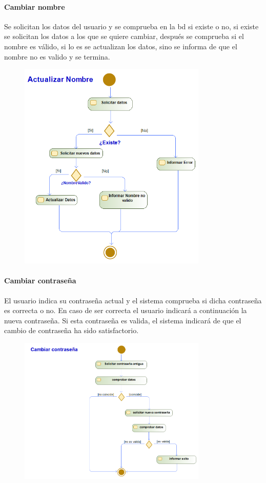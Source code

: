 \paragraph{Cambiar nombre}
Se solicitan los datos del usuario y se comprueba en la \gls{bd} si existe o no, si existe se solicitan los datos a los que se quiere cambiar, después se comprueba si el nombre es válido, si lo es se actualizan los datos, sino se informa de que el nombre no es valido y se termina.
\begin{figure}[H]
    \centering
    \includegraphics[width=0.8\textwidth]{Use_Cases/Actualizar Nombre.png}
\end{figure}
\newpage
\paragraph{Cambiar contraseña}
El usuario indica su contraseña actual y el sistema comprueba si dicha contraseña es correcta o no. En caso de ser correcta el usuario indicará a continuación la nueva contraseña. Si esta contraseña es valida, el sistema indicará de que el cambio de contraseña ha sido satisfactorio.
\begin{figure}[H]
    \centering
    \includegraphics[width=0.8\textwidth]{Use_Cases/cambiar_contrasena.png}
\end{figure}
\newpage
